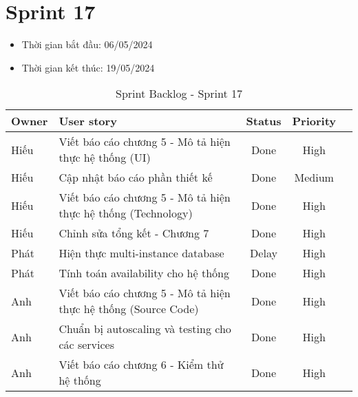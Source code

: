 \section{Sprint 17}
\begin{itemize}
    \item Thời gian bắt đầu: 06/05/2024
    \item Thời gian kết thúc: 19/05/2024
\end{itemize}
\begin{table}[H]
    \begin{tabular}{|m{2.5cm}|m{9cm}|c|c|c|}
    \hline
    \textbf{Owner}  & \textbf{User story}                                & \textbf{Status}  & \textbf{Priority} \\ \hline
    Hiếu                & Viết báo cáo chương 5 - Mô tả hiện thực hệ thống (UI)                & Done                              & High         \\ \hline
    Hiếu               & Cập nhật báo cáo phần thiết kế                 & Done                              & Medium        \\ \hline
    Hiếu                & Viết báo cáo chương 5 - Mô tả hiện thực hệ thống (Technology)                  & Done                              & High         \\ \hline
    Hiếu               & Chỉnh sửa tổng kết - Chương 7                & Done                              & High         \\ \hline
    Phát               & Hiện thực multi-instance database                 & Delay                              & High         \\ \hline
    Phát               & Tính toán availability cho hệ thống                & Done                              & High         \\ \hline
    Anh               & Viết báo cáo chương 5 - Mô tả hiện thực hệ thống (Source Code)                 & Done                              & High         \\ \hline
    Anh               & Chuẩn bị autoscaling và testing cho các services                & Done                              & High         \\ \hline
    Anh               & Viết báo cáo chương 6 - Kiểm thử hệ thống                & Done                              & High         \\ \hline
    \end{tabular}
    \caption{Sprint Backlog - Sprint 17}
    \label{tab:sprint-17}
\end{table}
